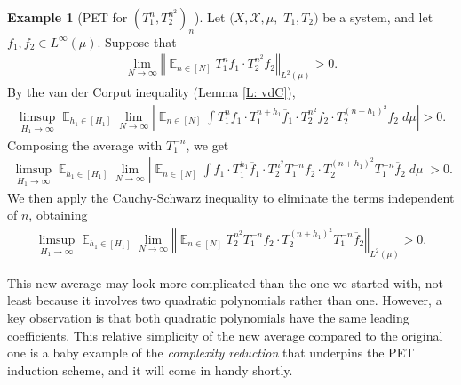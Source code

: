 \documentclass[11pt]{amsart}
\theoremstyle{definition}
\newtheorem{example}[lemma]{Example}
\DeclareMathOperator*{\E}{\mathbb{E}}
\newcommand{\CX}{{\mathcal X}}
\newcommand{\norm}[1]{\left\Vert #1\right\Vert}
\newcommand{\1}{{\mathbf{1}}}
\newcommand{\abs}[1]{\mathopen{}\left| #1\mathclose{}\right|}
\begin{document}
\begin{example}[PET for $(T_1^n, T_2^{n^2})_n$]\label{Ex: PET n, n^2}
    Let $(X, \CX, \mu,$\! $T_1, T_2)$ be a system, and let $f_1, f_2\in L^\infty(\mu)$. Suppose that 
    \begin{align*}
        \lim_{N\to\infty}\norm{\E_{n\in[N]}T_1^n f_1\cdot T_2^{n^2}f_2}_{L^2(\mu)}>0.
    \end{align*}
    By the van der Corput inequality (Lemma \ref{L: vdC}), 
    \begin{align*}
        \limsup_{H_1\to\infty}\E_{h_1\in[H_1]}\lim_{N\to\infty}\abs{\E_{n\in[N]}\int T_1^n f_1\cdot T_1^{n+h_1} \overline f_1\cdot T_2^{n^2}f_2\cdot T_2^{(n+h_1)^2}f_2\; d\mu}>0.
    \end{align*}
    Composing the average with $T_1^{-n}$, we get
    \begin{align*}
        \limsup_{H_1\to\infty}\E_{h_1\in[H_1]}\lim_{N\to\infty}\abs{\E_{n\in[N]}\int f_1\cdot T_1^{h_1} \overline f_1\cdot T_2^{n^2}T_1^{-n}f_2\cdot T_2^{(n+h_1)^2}T_1^{-n}\overline f_2\; d\mu}>0.
    \end{align*}
    We then apply the Cauchy-Schwarz inequality to eliminate the terms independent of $n$, obtaining 
    \begin{align*}
        \limsup_{H_1\to\infty}\E_{h_1\in[H_1]}\lim_{N\to\infty}\norm{\E_{n\in[N]} T_2^{n^2}T_1^{-n}f_2\cdot T_2^{(n+h_1)^2}T_1^{-n}\overline f_2}_{L^2(\mu)}>0.
    \end{align*}

    This new average may look more complicated than the one we started with, not least because it involves two quadratic polynomials rather than one. However, a key observation is that both quadratic polynomials have the same leading coefficients. This relative simplicity of the new average compared to the original one is a baby example of the \emph{complexity reduction} that underpins the PET induction scheme, and it will come in handy shortly. 
    

\end{example}
\end{document}

